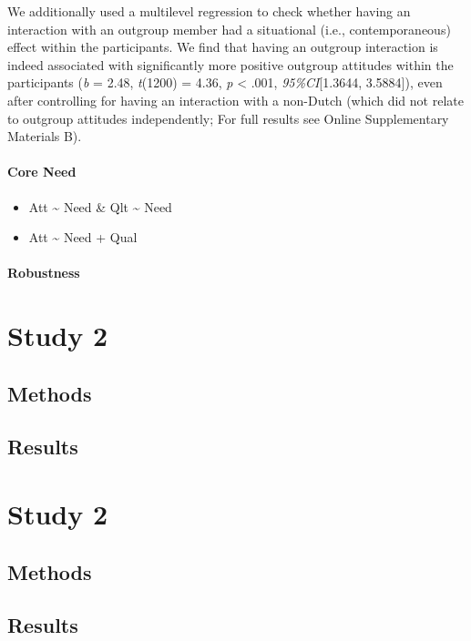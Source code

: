 We additionally used a multilevel regression to check whether having an
interaction with an outgroup member had a situational (i.e.,
contemporaneous) effect within the participants. We find that having an
outgroup interaction is indeed associated with significantly more
positive outgroup attitudes within the participants (\textit{b} = 2.48,
\textit{t}(1200) = 4.36, \textit{p} \textless{} .001,
\textit{95\%CI}{[}1.3644, 3.5884{]}), even after controlling for having
an interaction with a non-Dutch (which did not relate to outgroup
attitudes independently; For full results see Online Supplementary
Materials B).

\paragraph{Core Need}

\begin{itemize}
\tightlist
\item
  Att \textasciitilde{} Need \& Qlt \textasciitilde{} Need
\item
  Att \textasciitilde{} Need + Qual
\end{itemize}

\paragraph{Robustness}

\section{Study 2}

\subsection{Methods}

\subsection{Results}

\section{Study 2}

\subsection{Methods}

\subsection{Results}
